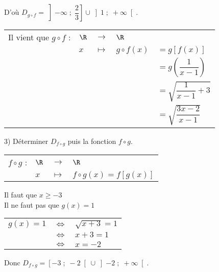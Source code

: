 D'où $D_{g \circ f} = \left]-\infty \; ; \; \dfrac{2}{3}\right]\cup\left]1\; ; \; +\infty\right[$. \\

\begin{tabular}{lllll}
Il vient que $g \circ f$ : & $\R$ & $\longrightarrow$ & $\R$ & \\
& $x$ & $\longmapsto$ & $g \circ f\left(x\right) $ & $= g\left[f\left(x\right)\right]$ \\
& & & & $=g\left(\dfrac{1}{x-1}\right)$ \\
& & & & $= \sqrt{\dfrac{1}{x-1} + 3}$ \\
& & & & $= \sqrt{\dfrac{3x-2}{x-1}}$ \\ 
\end{tabular}

\newpage

3) Déterminer $D_{f \circ g}$ puis la fonction $f \circ g$. \\

\begin{tabular}{llll}
$f \circ g$ : & $\R$ & $\longrightarrow$ & $\R$ \\
& $x$ & $\longmapsto$ & $f \circ g\left(x\right) = f\left[g\left(x\right)\right]$ \\
\end{tabular}

\vspace*{.3cm}

Il faut que $x \geqslant -3$ \\

Il ne faut pas que $g\left(x\right) = 1$ \\

\begin{tabular}{lll}
$g\left(x\right) = 1$ & $\Longleftrightarrow$ & $\sqrt{x+3} = 1$ \\
& $\Longleftrightarrow$ & $x+3 = 1$ \\
& $\Longleftrightarrow$ & $x = -2$ \\
\end{tabular}

\vspace*{.3cm}

Donc $D_{f \circ g} = \left[-3 \; ; \; -2 \right[ \cup \left]-2 \; ; \; +\infty \right[$. \\

